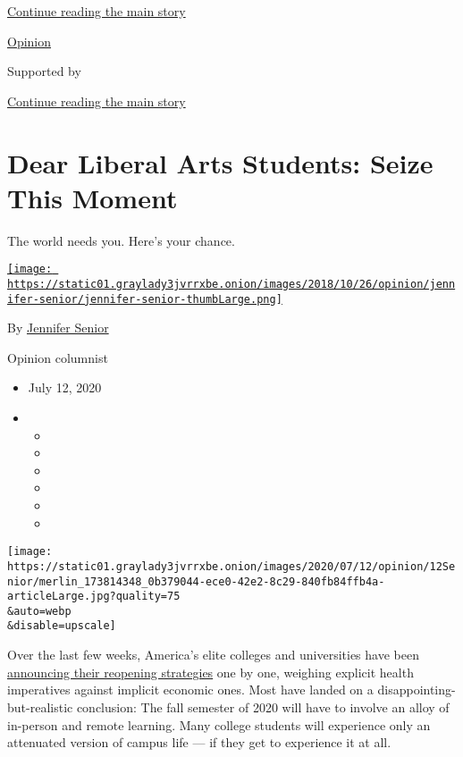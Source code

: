 \protect\hyperlink{after-top}{Continue reading the main story}

\href{/section/opinion}{Opinion}

Supported by

\protect\hyperlink{after-sponsor}{Continue reading the main story}

\hypertarget{dear-liberal-arts-students-seize-this-moment}{%
\section{Dear Liberal Arts Students: Seize This
Moment}\label{dear-liberal-arts-students-seize-this-moment}}

The world needs you. Here's your chance.

\href{https://www.nytimes3xbfgragh.onion/by/jennifer-senior}{\texttt{[image: https://static01.graylady3jvrrxbe.onion/images/2018/10/26/opinion/jennifer-senior/jennifer-senior-thumbLarge.png]}}

By \href{https://www.nytimes3xbfgragh.onion/by/jennifer-senior}{Jennifer
Senior}

Opinion columnist

\begin{itemize}
\item
  July 12, 2020
\item
  \begin{itemize}
  \item
  \item
  \item
  \item
  \item
  \item
  \end{itemize}
\end{itemize}

\texttt{[image: https://static01.graylady3jvrrxbe.onion/images/2020/07/12/opinion/12Senior/merlin\_173814348\_0b379044-ece0-42e2-8c29-840fb84ffb4a-articleLarge.jpg?quality=75\\\&auto=webp\\\&disable=upscale]}

Over the last few weeks, America's elite colleges and universities have
been
\href{https://www.washingtonpost.com/education/2020/07/06/harvard-reopen-with-fewer-than-half-undergrads-campus-because-coronavirus/}{announcing
their reopening strategies} one by one, weighing explicit health
imperatives against implicit economic ones. Most have landed on a
disappointing-but-realistic conclusion: The fall semester of 2020 will
have to involve an alloy of in-person and remote learning. Many college
students will experience only an attenuated version of campus life ---
if they get to experience it at all.

